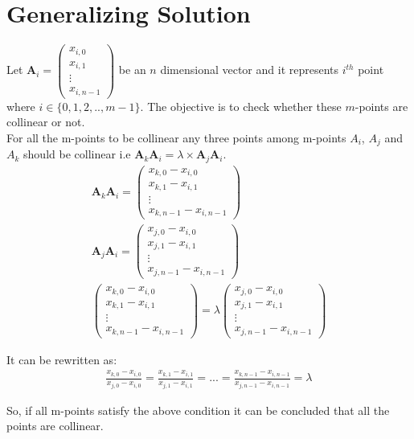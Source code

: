 \documentclass[journal,12pt,twocolumn]{IEEEtran}
\begin{document}
\section{Generalizing Solution}

Let $\textbf{A}_{i} = \begin{pmatrix} x_{i,0} \\ x_{i,1} \\ \vdots \\ x_{i, n-1} \end{pmatrix}$ be an $n$ dimensional vector and it represents $i^{th}$ point where $i \in \{0,1,2,..,m-1\}$. The objective is to check whether these $m$-points are collinear or not.\\

For all the m-points to be collinear any three points among m-points $A_{i}$, $A_{j}$ and $A_{k}$ should be collinear i.e $\textbf{A}_{k}\textbf{A}_{i} = \lambda \times \textbf{A}_{j}\textbf{A}_{i}$.\\

\begin{align}
\textbf{A}_{k}\textbf{A}_{i} = \begin{pmatrix} x_{k,0} - x_{i,0} \\ x_{k,1} - x_{i,1} \\ \vdots \\ x_{k,n-1} - x_{i,n-1} \end{pmatrix} \\
\textbf{A}_{j}\textbf{A}_{i} = \begin{pmatrix} x_{j,0} - x_{i,0} \\ x_{j,1} - x_{i,1} \\ \vdots \\ x_{j,n-1} - x_{i,n-1} \end{pmatrix} \\
\begin{pmatrix} x_{k,0} - x_{i,0} \\ x_{k,1} - x_{i,1} \\ \vdots \\ x_{k,n-1} - x_{i,n-1} \end{pmatrix} = \lambda \begin{pmatrix} x_{j,0} - x_{i,0} \\ x_{j,1} - x_{i,1} \\ \vdots \\ x_{j,n-1} - x_{i,n-1} \end{pmatrix}
\end{align}

It can be rewritten as:
\begin{multline}
\frac{x_{k,0} - x_{i,0}}{x_{j,0} - x_{i,0}} = \frac{x_{k,1} - x_{i,1}}{x_{j,1} - x_{i,1}} = ... = \frac{x_{k,n-1} - x_{i,n-1}}{x_{j,n-1} - x_{i,n-1}} = \lambda
\end{multline}

So, if all m-points satisfy the above condition it can be concluded that all the points are collinear.
\end{document}
